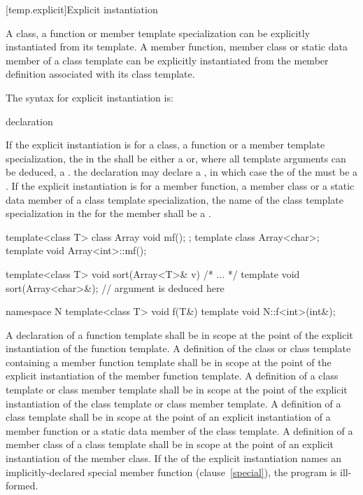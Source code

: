 [temp.explicit]{Explicit instantiation}

\pnum
{}%
A class, a function or member template specialization can be explicitly
instantiated from its template.
A member function, member class or static data member of a class template can
be explicitly instantiated from the member definition associated with its class
template.

\pnum
The syntax for explicit instantiation is:

\begin{bnf}
\br
   declaration
\end{bnf}

If the explicit instantiation is for a class,
a function or a member template specialization,
the
in the
shall be either a
or, where all template arguments can be deduced, a
.
\enternote
the declaration may declare a
,
in which case the
of the
must be a
.
\exitnote
If the explicit instantiation is for a member function, a member class or
a static data member of a class template specialization,
the name of the class template specialization in the
for the member  shall be a .
\enterexample

\begin{codeblock}
template<class T> class Array { void mf(); };
template class Array<char>;
template void Array<int>::mf();

template<class T> void sort(Array<T>& v) { /* ... */ }
template void sort(Array<char>&);       // argument is deduced here

namespace N {
	template<class T> void f(T&) { }
}
template void N::f<int>(int&);
\end{codeblock}
\exitexampleb

\pnum
A declaration of a function template shall be in scope at the point of the
explicit instantiation of the function template. A definition of the class
or class template containing a member function template shall be in scope at
the point of the explicit instantiation of the member function template.
A definition of a class template or class member template shall be in scope
at the point of the explicit instantiation of the class template or class
member template. A definition of a class template shall be in scope at the
point of an explicit instantiation of a member function or a static data member
of the class template. A definition of a member class of a class template
shall be in scope at the point of an explicit instantiation of the member
class.  If the 
of the explicit instantiation names an implicitly-declared special member
function (clause~\ref{special}), the program is ill-formed.

